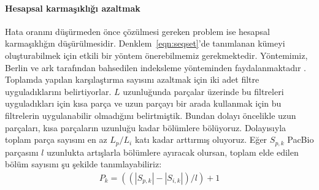 \paragraph{Hesapsal karmaşıklığı azaltmak}
Hata oranını düşürmeden önce çözülmesi gereken problem ise hesapsal karmaşıklığın düşürülmesidir. Denklem~\ref{eqn:seqset}'de tanımlanan kümeyi oluşturabilmek için etkili bir yöntem önerebilmemiz gerekmektedir. Yöntemimiz, Berlin ve ark tarafından bahsedilen indeksleme yönteminden faydalanmaktadır \cite{Berlin2015}. Toplamda yapılan karşılaştırma sayısını azaltmak için iki adet filtre uyguladıklarını belirtiyorlar. $L$ uzunluğunda parçalar üzerinde bu filtreleri uyguladıkları için kısa parça ve uzun parçayı bir arada kullanmak için bu filtrelerin uygulanabilir olmadığını belirtmiştik. Bundan dolayı öncelikle uzun parçaları, kısa parçaların uzunluğu kadar bölümlere bölüyoruz. Dolayısıyla toplam parça sayısını en az $L_p / L_i$ katı kadar arttırmış oluyoruz. Eğer $S_{p,k}$ PacBio parçasını $l$ uzunlukta artışlarla bölümlere ayıracak olursan, toplam elde edilen bölüm sayısını şu şekilde tanımlayabiliriz:
\begin{gather*}
P_k = ((|S_{p,k}| - |S_{i,k}| )/l) + 1
\end{gather*}
